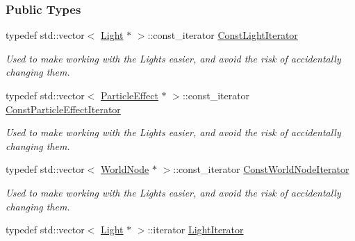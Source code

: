 \subsubsection*{Public Types}
\begin{DoxyCompactItemize}
\item 
\hypertarget{classphys_1_1SceneManager_a417c57b560317661d0c7d836a88f52ac}{
typedef std::vector$<$ \hyperlink{classphys_1_1Light}{Light} $\ast$ $>$::const\_\-iterator \hyperlink{classphys_1_1SceneManager_a417c57b560317661d0c7d836a88f52ac}{ConstLightIterator}}
\label{classphys_1_1SceneManager_a417c57b560317661d0c7d836a88f52ac}

\begin{DoxyCompactList}\small\item\em Used to make working with the Lights easier, and avoid the risk of accidentally changing them. \item\end{DoxyCompactList}\item 
\hypertarget{classphys_1_1SceneManager_a0026f62b121b0d7010a67a79fdc9000c}{
typedef std::vector$<$ \hyperlink{classphys_1_1ParticleEffect}{ParticleEffect} $\ast$ $>$::const\_\-iterator \hyperlink{classphys_1_1SceneManager_a0026f62b121b0d7010a67a79fdc9000c}{ConstParticleEffectIterator}}
\label{classphys_1_1SceneManager_a0026f62b121b0d7010a67a79fdc9000c}

\begin{DoxyCompactList}\small\item\em Used to make working with the Lights easier, and avoid the risk of accidentally changing them. \item\end{DoxyCompactList}\item 
\hypertarget{classphys_1_1SceneManager_aa893eadb43492c0a4a9cafe2d150742c}{
typedef std::vector$<$ \hyperlink{classphys_1_1WorldNode}{WorldNode} $\ast$ $>$::const\_\-iterator \hyperlink{classphys_1_1SceneManager_aa893eadb43492c0a4a9cafe2d150742c}{ConstWorldNodeIterator}}
\label{classphys_1_1SceneManager_aa893eadb43492c0a4a9cafe2d150742c}

\begin{DoxyCompactList}\small\item\em Used to make working with the Lights easier, and avoid the risk of accidentally changing them. \item\end{DoxyCompactList}\item 
\hypertarget{classphys_1_1SceneManager_a2764b9082b4aecbf833c2f6e9f174ba0}{
typedef std::vector$<$ \hyperlink{classphys_1_1Light}{Light} $\ast$ $>$::iterator \hyperlink{classphys_1_1SceneManager_a2764b9082b4aecbf833c2f6e9f174ba0}{LightIterator}}
\label{classphys_1_1SceneManager_a2764b9082b4aecbf833c2f6e9f174ba0}


\end{DoxyCompactItemize}
